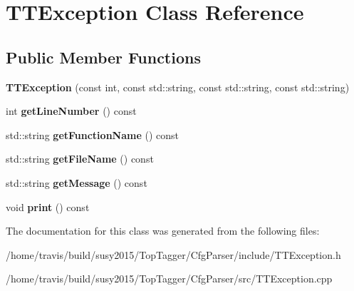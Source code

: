\hypertarget{classTTException}{\section{T\-T\-Exception Class Reference}
\label{classTTException}
}
\subsection*{Public Member Functions}
\begin{DoxyCompactItemize}
\item 
\hypertarget{classTTException_a9b4ef38abc1a5944eea011d63f7574e1}{{\bfseries T\-T\-Exception} (const int, const std\-::string, const std\-::string, const std\-::string)}\label{classTTException_a9b4ef38abc1a5944eea011d63f7574e1}

\item 
\hypertarget{classTTException_a0438e0a4023264e996288ac23581e0c3}{int {\bfseries get\-Line\-Number} () const }\label{classTTException_a0438e0a4023264e996288ac23581e0c3}

\item 
\hypertarget{classTTException_a342c0204e296e2fdae3b60b12d348592}{std\-::string {\bfseries get\-Function\-Name} () const }\label{classTTException_a342c0204e296e2fdae3b60b12d348592}

\item 
\hypertarget{classTTException_a3d7570a3fd6f0702069be6450e3c6a63}{std\-::string {\bfseries get\-File\-Name} () const }\label{classTTException_a3d7570a3fd6f0702069be6450e3c6a63}

\item 
\hypertarget{classTTException_ac37882c84da17e0e2c78637e97ba4b09}{std\-::string {\bfseries get\-Message} () const }\label{classTTException_ac37882c84da17e0e2c78637e97ba4b09}

\item 
\hypertarget{classTTException_ab67669a727365d75c4dbd63860bf7c85}{void {\bfseries print} () const }\label{classTTException_ab67669a727365d75c4dbd63860bf7c85}

\end{DoxyCompactItemize}


The documentation for this class was generated from the following files\-:\begin{DoxyCompactItemize}
\item 
/home/travis/build/susy2015/\-Top\-Tagger/\-Cfg\-Parser/include/T\-T\-Exception.\-h\item 
/home/travis/build/susy2015/\-Top\-Tagger/\-Cfg\-Parser/src/T\-T\-Exception.\-cpp\end{DoxyCompactItemize}
